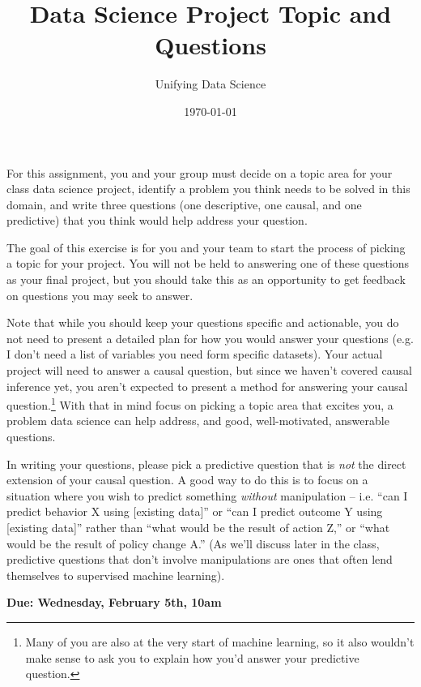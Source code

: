 \documentclass[12pt]{article}
\title{Data Science Project Topic and Questions}
\author{Unifying Data Science}
\date{\today}
\begin{document}
\maketitle

For this assignment, you and your group must decide on a topic area for your class data science project, identify a problem you think needs to be solved in this domain, and write three questions (one descriptive, one causal, and one predictive) that you think would help address your question.

The goal of this exercise is for you and your team to start the process of picking a topic for your project. You will not be held to answering one of these questions as your final project, but you should take this as an opportunity to get feedback on questions you may seek to answer.

Note that while you should keep your questions specific and actionable, you do not need to present a detailed plan for how you would answer your questions (e.g. I don't need a list of variables you need form specific datasets). Your actual project will need to answer a causal question, but since we haven't covered causal inference yet, you aren't expected to present a method for answering your causal question.\footnote{Many of you are also at the very start of machine learning, so it also wouldn't make sense to ask you to explain how you'd answer your predictive question.} With that in mind focus on picking a topic area that excites you, a problem data science can help address, and good, well-motivated, answerable questions.

In writing your questions, please pick a predictive question that is \emph{not} the direct extension of your causal question. A good way to do this is to focus on a situation where you wish to predict something \emph{without} manipulation -- i.e. ``can I predict behavior X using [existing data]'' or ``can I predict outcome Y using [existing data]'' rather than ``what would be the result of action Z,'' or ``what would be the result of policy change A.'' (As we'll discuss later in the class, predictive questions that don't involve manipulations are ones that often lend themselves to supervised machine learning).

\textbf{Due: Wednesday, February 5th, 10am}
\end{document}
